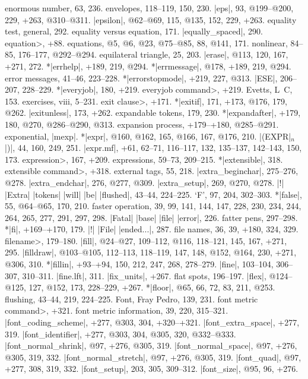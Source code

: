 enormous number, 63, 236.
envelopes, 118--119, 150, 230.
|eps|, 93, @199--@200, 229, +263, @310--@311.
|epsilon|, @62--@69, 115, @135, 152, 229, +263.
equality test, general, 292.
equality versus equation, 171.
|equally_spaced|, 290.
\<equation>, +88.
equations, @5, @6, @23, @75--@85, 88, @141, 171.
\sub nonlinear, 84--85, 176--177, @292--@294.
equilateral triangle, 25, 203.
|erase|, @113, 120, 167, +271, 272.
*|errhelp|, +189, 219, @294.
*|errmessage|, @178, +189, 219, @294.
error messages, 41--46, 223--228.
*|errorstopmode|, +219, 227, @313.
|ESE|, 206--207, 228--229.
*|everyjob|, 180, +219.
\<everyjob command>, +219.
Evetts, L\period\ C\period, 153.
exercises, viii, 5--231.
\<exit clause>, +171.
*|exitif|, 171, +173, @176, 179, @262.
|exitunless|, 173, +262.
expandable tokens, 179, 230.
*|expandafter|, +179, 180, @270, @286--@290, @313.
expansion process, +179--+180, @285--@291.
exponential, \see |mexp|.
*|expr|, @160, @162, 165, @166, 167, @176, 210.
|(EXPR|$_n$|)|, 44, 160, 249, 251.
|expr.mf|, +61, 62--71, 116--117, 132, 135--137, 142--143, 150, 173.
\<expression>, 167, +209.
expressions, 59--73, 209--215.
*|extensible|, 318.
\<extensible command>, +318.
external tags, 55, 218.
|extra_beginchar|, 275--276, @278.
|extra_endchar|, 276, @277, @309.
|extra_setup|, 269, @270, @278.
|!| |Extra| |tokens| |will| |be| |flushed|, 43--44, 224--225.
\newletter
`F', 97, 204, 302--303.
*|false|, 55, @64--@65, 170, 210.
faster operation, 39, 99, 141, 144, 147, 228, 230, 234, 244, 264, 265, 277,
 291, 297, 298.
|Fatal| |base| |file| |error|, 226.
fatter pens, 297--298.
*|fi|, +169--+170, 179.
|!| |File| |ended...|, 287.
file names, 36, 39, +180, 324, 329.
\<filename>, 179--180.
|fill|, @24--@27, 109--112, @116, 118--121, 145, 167, +271, 295.
|filldraw|, @103--@105, 112--113, 118--119, 147, 148, @152, @164,
 230, +271, @306, 310.
*|fillin|, +93--+94, 150, 212, 247, 268, 278--279.
|fine|, 103--104, 306--307, 310--311.
|fine.lft|, 311.
|fix_units|, +267.
flat spots, 196--197.
|flex|, @124--@125, 127, @152, 173, 228--229, +267.
*|floor|, @65, 66, 72, 83, 211, @253.
flushing, 43--44, 219, 224--225.
Font, Fray Pedro, 139, 231.
\<font metric command>, +321.
font metric information, 39, 220, 315--321.
|font_coding_scheme|, +277, @303, 304, +320--+321.
|font_extra_space|, +277, 319.
|font_identifier|, +277, @303, 304, @305, 320, @332--@333.
|font_normal_shrink|, @97, +276, @305, 319.
|font_normal_space|, @97, +276, @305, 319, 332.
|font_normal_stretch|, @97, +276, @305, 319.
|font_quad|, @97, +277, 308, 319, 332.
|font_setup|, 203, 305, 309--312.
|font_size|, @95, 96, +276.
